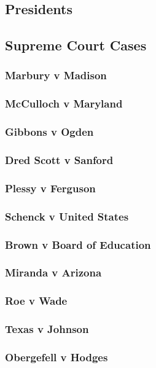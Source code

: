 			
	
		\subsection{Presidents}
		\newpage
		\subsection{Supreme Court Cases}
			\subsubsection{Marbury v Madison}
			\subsubsection{McCulloch v Maryland}
			\subsubsection{Gibbons v Ogden}
			\subsubsection{Dred Scott v Sanford}
			\subsubsection{Plessy v Ferguson}
			\subsubsection{Schenck v United States}
			\subsubsection{Brown v Board of Education}
			\subsubsection{Miranda v Arizona}
			\subsubsection{Roe v Wade}
			\subsubsection{Texas v Johnson}
			\subsubsection{Obergefell v Hodges}
